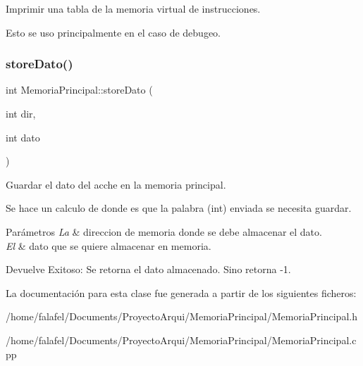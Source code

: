 Imprimir una tabla de la memoria virtual de instrucciones. 

Esto se uso principalmente en el caso de debugeo. \mbox{\label{classMemoriaPrincipal_a0334ed61e40292259985655430efad33}} 
\subsubsection{\texorpdfstring{store\+Dato()}{storeDato()}}
{\footnotesize\ttfamily int Memoria\+Principal\+::store\+Dato (\begin{DoxyParamCaption}\item[{int}]{dir,  }\item[{int}]{dato }\end{DoxyParamCaption})}



Guardar el dato del acche en la memoria principal. 

Se hace un calculo de donde es que la palabra (int) enviada se necesita guardar. 
\begin{DoxyParams}{Parámetros}
{\em La} & direccion de memoria donde se debe almacenar el dato. \\
\hline
{\em El} & dato que se quiere almacenar en memoria. \\
\hline
\end{DoxyParams}
\begin{DoxyReturn}{Devuelve}
Exitoso\+: Se retorna el dato almacenado. Sino retorna -\/1. 
\end{DoxyReturn}


La documentación para esta clase fue generada a partir de los siguientes ficheros\+:\begin{DoxyCompactItemize}
\item 
/home/falafel/\+Documents/\+Proyecto\+Arqui/\+Memoria\+Principal/Memoria\+Principal.\+h\item 
/home/falafel/\+Documents/\+Proyecto\+Arqui/\+Memoria\+Principal/Memoria\+Principal.\+cpp\end{DoxyCompactItemize}
